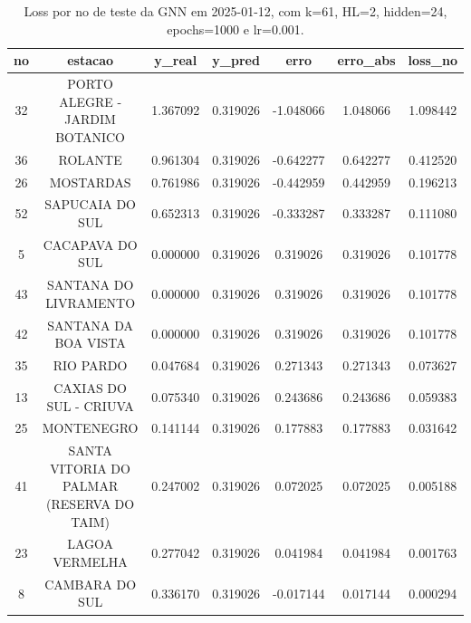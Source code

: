 \begin{table}[h]
\centering
\caption{Loss por no de teste da GNN em 2025-01-12, com k=61, HL=2, hidden=24, epochs=1000 e lr=0.001.}
\label{tab:gnn_loss_k61_hl2_h24_e1000_d20250112}
\begin{tabular}{ccccccc}
\toprule
no & estacao & y\_real & y\_pred & erro & erro\_abs & loss\_no \\
\midrule
32 & PORTO ALEGRE - JARDIM BOTANICO & 1.367092 & 0.319026 & -1.048066 & 1.048066 & 1.098442 \\
36 & ROLANTE & 0.961304 & 0.319026 & -0.642277 & 0.642277 & 0.412520 \\
26 & MOSTARDAS & 0.761986 & 0.319026 & -0.442959 & 0.442959 & 0.196213 \\
52 & SAPUCAIA DO SUL & 0.652313 & 0.319026 & -0.333287 & 0.333287 & 0.111080 \\
5 & CACAPAVA DO SUL & 0.000000 & 0.319026 & 0.319026 & 0.319026 & 0.101778 \\
43 & SANTANA DO LIVRAMENTO & 0.000000 & 0.319026 & 0.319026 & 0.319026 & 0.101778 \\
42 & SANTANA DA BOA VISTA & 0.000000 & 0.319026 & 0.319026 & 0.319026 & 0.101778 \\
35 & RIO PARDO & 0.047684 & 0.319026 & 0.271343 & 0.271343 & 0.073627 \\
13 & CAXIAS DO SUL - CRIUVA & 0.075340 & 0.319026 & 0.243686 & 0.243686 & 0.059383 \\
25 & MONTENEGRO & 0.141144 & 0.319026 & 0.177883 & 0.177883 & 0.031642 \\
41 & SANTA VITORIA DO PALMAR (RESERVA DO TAIM) & 0.247002 & 0.319026 & 0.072025 & 0.072025 & 0.005188 \\
23 & LAGOA VERMELHA & 0.277042 & 0.319026 & 0.041984 & 0.041984 & 0.001763 \\
8 & CAMBARA DO SUL & 0.336170 & 0.319026 & -0.017144 & 0.017144 & 0.000294 \\
\bottomrule
\end{tabular}
\end{table}
